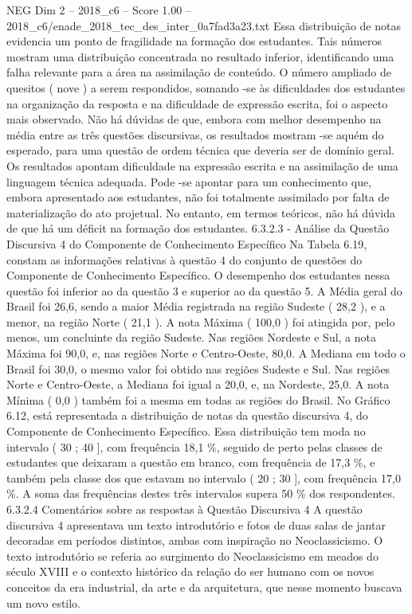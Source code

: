 \begin{textsample}{NEG Dim 2 – 2018\_c6 – Score 1.00 – 2018\_c6/enade\_2018\_tec\_des\_inter\_0a7fad3a23.txt}
Essa distribuição de notas evidencia um ponto de fragilidade na formação dos estudantes.
Tais números mostram uma distribuição concentrada no resultado inferior, identificando uma falha relevante para a área na assimilação de conteúdo.
O número ampliado de quesitos ( nove ) a serem respondidos, somando -se às dificuldades dos estudantes na organização da resposta e na dificuldade de expressão escrita, foi o aspecto mais observado.
Não há dúvidas de que, embora com melhor desempenho na média entre as três questões discursivas, os resultados mostram -se aquém do esperado, para uma questão de ordem técnica que deveria ser de domínio geral.
Os resultados apontam dificuldade na expressão escrita e na assimilação de uma linguagem técnica adequada.
Pode -se apontar para um conhecimento que, embora apresentado aos estudantes, não foi totalmente assimilado por falta de materialização do ato projetual.
No entanto, em termos teóricos, não há dúvida de que há um déficit na formação dos estudantes. 6.3.2.3 - Análise da Questão Discursiva 4 do Componente de Conhecimento Específico Na Tabela 6.19, constam as informações relativas à questão 4 do conjunto de questões do Componente de Conhecimento Específico.
O desempenho dos estudantes nessa questão foi inferior ao da questão 3 e superior ao da questão 5.
A Média geral do Brasil foi 26,6, sendo a maior Média registrada na região Sudeste ( 28,2 ), e a menor, na região Norte ( 21,1 ).
A nota Máxima ( 100,0 ) foi atingida por, pelo menos, um concluinte da região Sudeste.
Nas regiões Nordeste e Sul, a nota Máxima foi 90,0, e, nas regiões Norte e Centro-Oeste, 80,0.
A Mediana em todo o Brasil foi 30,0, o mesmo valor foi obtido nas regiões Sudeste e Sul.
Nas regiões Norte e Centro-Oeste, a Mediana foi igual a 20,0, e, na Nordeste, 25,0.
A nota Mínima ( 0,0 ) também foi a mesma em todas as regiões do Brasil.
No Gráfico 6.12, está representada a distribuição de notas da questão discursiva 4, do Componente de Conhecimento Específico.
Essa distribuição tem moda no intervalo ( 30 ; 40 ], com frequência 18,1 \%, seguido de perto pelas classes de estudantes que deixaram a questão em branco, com frequência de 17,3 \%, e também pela classe dos que estavam no intervalo ( 20 ; 30 ], com frequência 17,0 \%.
A soma das frequências destes três intervalos supera 50 \% dos respondentes. 6.3.2.4 Comentários sobre as respostas à Questão Discursiva 4 A questão discursiva 4 apresentava um texto introdutório e fotos de duas salas de jantar decoradas em períodos distintos, ambas com inspiração no Neoclassicismo.
O texto introdutório se referia ao surgimento do Neoclassicismo em meados do século XVIII e o contexto histórico da relação do ser humano com os novos conceitos da era industrial, da arte e da arquitetura, que nesse momento buscava um novo estilo.

\end{textsample}
